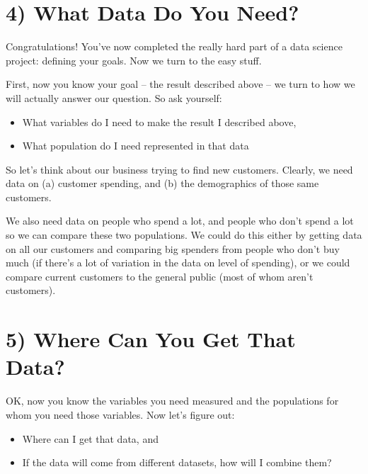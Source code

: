 \documentclass[letterpaper,10pt,english]{jupyterBook}
\begin{document}
\section{4) What Data Do You Need?}
\label{\detokenize{40_in_practice/05_backwards_design:what-data-do-you-need}}
\sphinxAtStartPar
Congratulations! You’ve now completed the really hard part of a data science project: defining your goals. Now we turn to the easy stuff.

\sphinxAtStartPar
First, now you know your goal – the result described above – we turn to how we will actually answer our question. So ask yourself:
\begin{itemize}
\item {} 
\sphinxAtStartPar
What variables do I need to make the result I described above,

\item {} 
\sphinxAtStartPar
What population do I need represented in that data

\end{itemize}

\sphinxAtStartPar
So let’s think about our business trying to find new customers. Clearly, we need data on (a) customer spending, and (b) the demographics of those same customers.

\sphinxAtStartPar
We also need data on  people who spend a lot, and people who don’t spend a lot so we can compare these two populations. We could do this either by getting data on all our customers and comparing big spenders from people who don’t buy much (if there’s a lot of variation in the data on level of spending), or we could compare current customers to the general public (most of whom aren’t customers).


\section{5) Where Can You Get That Data?}
\label{\detokenize{40_in_practice/05_backwards_design:where-can-you-get-that-data}}
\sphinxAtStartPar
OK, now you know the variables you need measured and the populations for whom you need those variables. Now let’s figure out:
\begin{itemize}
\item {} 
\sphinxAtStartPar
Where can I get that data, and

\item {} 
\sphinxAtStartPar
If the data will come from different datasets, how will I combine them?

\end{itemize}
\end{document}
